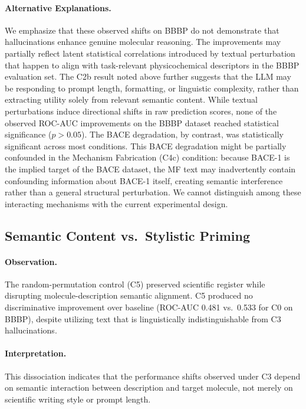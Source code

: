 \paragraph{Alternative Explanations.} We emphasize that these observed shifts on BBBP do not demonstrate that hallucinations enhance genuine molecular reasoning. The improvements may partially reflect latent statistical correlations introduced by textual perturbation that happen to align with task-relevant physicochemical descriptors in the BBBP evaluation set. The C2b result noted above further suggests that the LLM may be responding to prompt length, formatting, or linguistic complexity, rather than extracting utility solely from relevant semantic content. While textual perturbations induce directional shifts in raw prediction scores, none of the observed ROC-AUC improvements on the BBBP dataset reached statistical significance ($p > 0.05$). The BACE degradation, by contrast, was statistically significant across most conditions. This BACE degradation might be partially confounded in the Mechanism Fabrication (C4c) condition: because BACE-1 is the implied target of the BACE dataset, the MF text may inadvertently contain confounding information about BACE-1 itself, creating semantic interference rather than a general structural perturbation. We cannot distinguish among these interacting mechanisms with the current experimental design.

\subsection{Semantic Content vs.\ Stylistic Priming}
\paragraph{Observation.} The random-permutation control (C5) preserved scientific register while disrupting molecule-description semantic alignment. C5 produced no discriminative improvement over baseline (ROC-AUC 0.481 vs.\ 0.533 for C0 on BBBP), despite utilizing text that is linguistically indistinguishable from C3 hallucinations.

\paragraph{Interpretation.} This dissociation indicates that the performance shifts observed under C3 depend on semantic interaction between description and target molecule, not merely on scientific writing style or prompt length.

